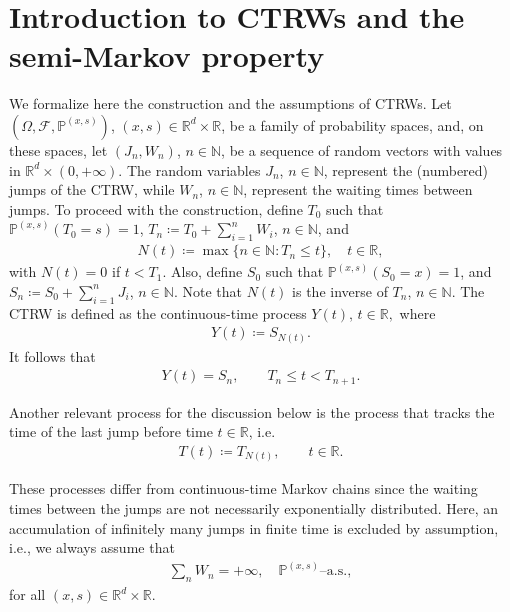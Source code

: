 \documentclass[reqno]{amsart}
\theoremstyle{remark}
\numberwithin{equation}{section} %
\newcommand{\R}{\mathbb{R}}
\newcommand{\N}{\mathbb{N}}
\newcommand{\RR}{\mathbb{R}}
\newcommand{\PP}{\mathds{P}}
\newcommand{\1}{\mathds{1}}
\begin{document}
	\section{Introduction to CTRWs and the semi-Markov property}\label{ss:CTRW-intro}
	We formalize here the construction and the assumptions of CTRWs.
	Let $(\Omega, \mathcal{F}, \PP^{(x,s)})$, $(x,s) \in \mathbb{R}^d \times \mathbb{R}$, be a family of probability spaces, and, on these spaces, let $(J_n, W_n)$, $n \in \mathbb{N}$, be a sequence of random vectors with values in $\mathbb{R}^d \times (0,+\infty)$. The random variables $J_n$, $n \in \mathbb{N}$, represent the (numbered) jumps of the CTRW, while $W_n$, $n \in \mathbb{N}$, represent the waiting times between jumps. To proceed with the construction, define $T_0$ such that $\PP^{(x,s)} (T_0=s)=1$, $T_n \coloneqq T_0+\sum_{i=1}^n W_i$, $n \in \mathbb{N}$, and
	\begin{align}\label{1047-inv}
		N(t) \coloneqq \max \{ n \in \mathbb{N}: T_n \leq t \}, \quad t\in\RR,
	\end{align}
	with $N(t)=0$ if $t<T_1$. Also, define $S_0$ such that $\PP^{(x,s)} (S_0=x)=1$, and $S_n \coloneqq S_0+\sum_{i=1}^nJ_i$, $n \in \mathbb{N}$. Note that $N(t)$ is the inverse of $T_n$, $n\in\N$. The CTRW is defined as the continuous-time process $Y(t),\, t \in \RR,$ where
	\begin{align}
		Y(t) \coloneqq S_{N(t)}.
		\label{defctrw}
	\end{align}
	It follows that
	\begin{align}
		Y(t) = S_n, \qquad T_n \leq t < T_{n+1}.
		\label{stepreprctrw}
	\end{align}
	
	Another relevant process for the discussion below is the process that tracks the time of the last jump before time $t\in\RR$, i.e.
	\begin{align}\label{last-jump}
		T(t) \coloneqq  T_{N(t)},\qquad t\in\RR.
	\end{align}
	
	These processes differ from continuous-time Markov chains since the waiting times between the jumps are not necessarily exponentially distributed. Here, an accumulation of infinitely many jumps in finite time is excluded by assumption, i.e., we always assume that
	\begin{align}
		\sum_n W_n = +\infty, \quad \PP^{(x,s)}\text{--a.s.},
		\label{nonexplosion}
	\end{align}
	for all $(x,s)\in \R^d\times \R$.
	
\end{document}
